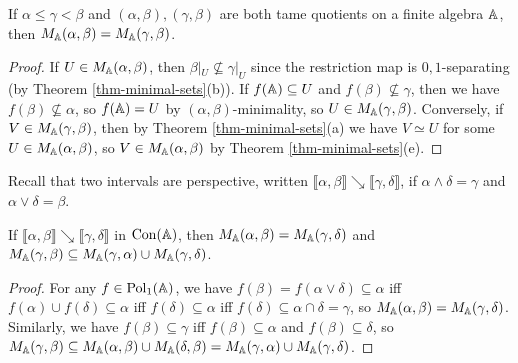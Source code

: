 \begin{appendices}
\begin{comment}
If $f(C) \subseteq N$ for some $f \in \Pol_1(\bA|_C)$ such that $f(C)$ is not contained in any congruence class of $\alpha$, then by Corollary \ref{cor-trace-iso} we have $f : N \simeq f(N)$, so in fact $f(N) = N$. This proves that $N$ is an $(\alpha|_C,1_C)$-minimal set of $\bA|_C$.

Now suppose that $(x,y) \in C^2 \setminus \alpha|_C$. Then by Theorem \ref{thm-minimal-sets}
\end{proof}
\end{comment}

\begin{prop} If $\alpha \le \gamma < \beta$ and $(\alpha,\beta), (\gamma,\beta)$ are both tame quotients on a finite algebra $\mathbb{A}$, then $M_{\mathbb{A}}(\alpha,\beta) = M_{\mathbb{A}}(\gamma,\beta)$.
\end{prop}
\begin{proof} If $U \in M_{\mathbb{A}}(\alpha,\beta)$, then $\beta|_U \not\subseteq \gamma|_U$ since the restriction map is $0,1$-separating (by Theorem \ref{thm-minimal-sets}(b)). If $f(\mathbb{A}) \subseteq U$ and $f(\beta) \not\subseteq \gamma$, then we have $f(\beta) \not\subseteq \alpha$, so $f(\mathbb{A}) = U$ by $(\alpha,\beta)$-minimality, so $U \in M_{\mathbb{A}}(\gamma,\beta)$. Conversely, if $V \in M_{\mathbb{A}}(\gamma,\beta)$, then by Theorem \ref{thm-minimal-sets}(a) we have $V \simeq U$ for some $U \in M_{\mathbb{A}}(\alpha,\beta)$, so $V \in M_{\mathbb{A}}(\alpha,\beta)$ by Theorem \ref{thm-minimal-sets}(e).
\end{proof}

Recall that two intervals are perspective, written $\llbracket \alpha, \beta \rrbracket \searrow \llbracket \gamma, \delta \rrbracket$, if $\alpha \wedge \delta = \gamma$ and $\alpha \vee \delta = \beta$.

\begin{prop} If $\llbracket \alpha, \beta \rrbracket \searrow \llbracket \gamma, \delta \rrbracket$ in $\operatorname{Con}(\mathbb{A})$, then $M_{\mathbb{A}}(\alpha,\beta) = M_{\mathbb{A}}(\gamma,\delta)$ and $M_{\mathbb{A}}(\gamma,\beta) \subseteq M_{\mathbb{A}}(\gamma,\alpha) \cup M_{\mathbb{A}}(\gamma, \delta)$.
\end{prop}
\begin{proof} For any $f \in \operatorname{Pol}_1(\mathbb{A})$, we have $f(\beta) = f(\alpha \vee \delta) \subseteq \alpha$ iff $f(\alpha) \cup f(\delta) \subseteq \alpha$ iff $f(\delta) \subseteq \alpha$ iff $f(\delta) \subseteq \alpha \cap \delta = \gamma$, so $M_{\mathbb{A}}(\alpha,\beta) = M_{\mathbb{A}}(\gamma,\delta)$. Similarly, we have $f(\beta) \subseteq \gamma$ iff $f(\beta) \subseteq \alpha$ and $f(\beta) \subseteq \delta$, so $M_{\mathbb{A}}(\gamma,\beta) \subseteq M_{\mathbb{A}}(\alpha,\beta) \cup M_{\mathbb{A}}(\delta,\beta) = M_{\mathbb{A}}(\gamma,\alpha) \cup M_{\mathbb{A}}(\gamma, \delta)$.
\end{proof}


\end{appendices}
